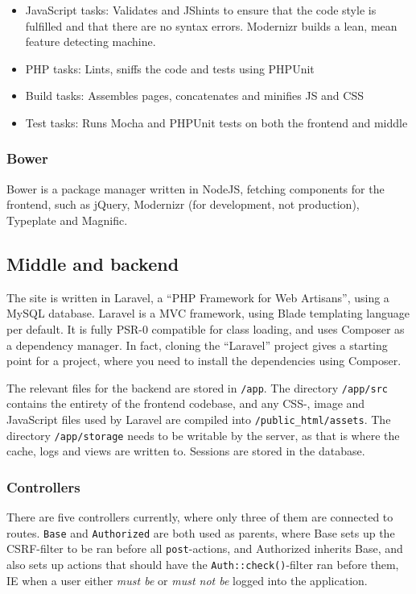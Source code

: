 \begin{itemize}
    \item JavaScript tasks: Validates and JShints to ensure that the code style is fulfilled and that there are no syntax errors. Modernizr builds a lean, mean feature detecting machine.
    \item PHP tasks: Lints, sniffs the code and tests using PHPUnit
    \item Build tasks: Assembles pages, concatenates and minifies JS and CSS
    \item Test tasks: Runs Mocha and PHPUnit tests on both the frontend and middle
\end{itemize}

\subsubsection{Bower}
\noindent
Bower is a package manager written in NodeJS, fetching components for the frontend, such as jQuery, Modernizr (for development, not production), Typeplate and Magnific.

\subsection{Middle and backend}
\noindent
The site is written in Laravel, a \enquote{PHP Framework for Web Artisans}\citep{Laravel4}, using a MySQL database. Laravel is a MVC framework, using Blade templating language per default. It is fully PSR-0\citep{PSR} compatible for class loading, and uses Composer as a dependency manager. In fact, cloning the ``Laravel'' project gives a starting point for a project, where you need to install the dependencies using Composer.

The relevant files for the backend are stored in \texttt{/app}. The directory \texttt{/app/src} contains the entirety of the frontend codebase, and any CSS-, image and JavaScript files used by Laravel are compiled into \texttt{/public\_html/assets}. The directory \texttt{/app/storage} needs to be writable by the server, as that is where the cache, logs and views are written to. Sessions are stored in the database.

\subsubsection{Controllers}
\noindent
There are five controllers currently, where only three of them are connected to routes. \texttt{Base} and \texttt{Authorized} are both used as parents, where Base sets up the CSRF-filter to be ran before all \texttt{post}-actions, and Authorized inherits Base, and also sets up actions that should have the \texttt{Auth::check()}-filter ran before them, IE when a user either \emph{must be} or \emph{must not be} logged into the application.

